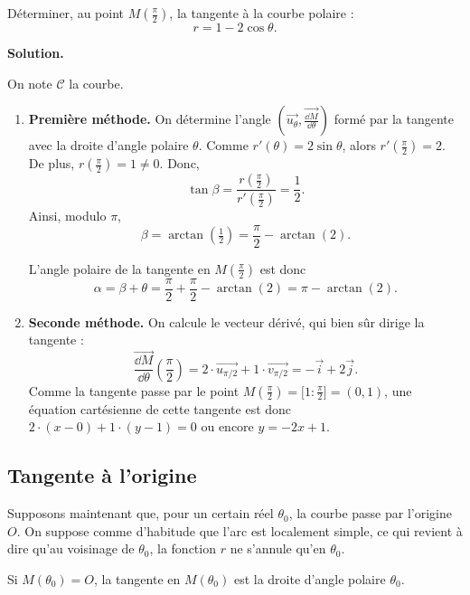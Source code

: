 \documentclass[class=report,crop=false]{standalone}
\begin{document}
\begin{exemple}
Déterminer, au point $M(\frac{\pi}{2})$, la tangente à la courbe polaire :
$$r=1-2\cos\theta.$$

\medskip
\textbf{Solution.}

On note $\mathcal{C}$ la courbe.

\begin{enumerate}
  \item \textbf{Première méthode.}
  On détermine l'angle
  $(\overrightarrow{u_\theta},\overrightarrow{\frac{\dd M}{\dd\theta}})$
  formé par la tangente avec la droite d'angle polaire $\theta$.
  Comme $r'(\theta)=2\sin\theta$, alors $r'(\frac{\pi}{2})=2$.
  De plus, $r(\frac{\pi}{2})=1\neq0$. Donc,
  $$\tan\beta  = \frac{r(\frac{\pi}{2})}{r'(\frac{\pi}{2})} = \frac{1}{2}.$$
  Ainsi, modulo $\pi$,
  $$\beta = \arctan(\tfrac{1}{2})
  = \frac\pi2-\arctan(2).$$

  L'angle polaire de la tangente en $M(\frac{\pi}{2})$ est
donc
$$\alpha=\beta + \theta=\frac\pi2+\frac\pi2-\arctan(2) = \pi-\arctan(2).$$

  \item \textbf{Seconde méthode.}
  On calcule le vecteur dérivé, qui bien sûr dirige la tangente :
  $$\overrightarrow{\frac{\dd M}{\dd\theta}}\left(\frac{\pi}{2}\right)
=2\cdot\overrightarrow{u_{\pi/2}}+1\cdot\overrightarrow{v_{\pi/2}}
=-\overrightarrow{i}+2\overrightarrow{j}.$$
  Comme la tangente passe par le point
  $M(\frac{\pi}{2}) = \big[1:\frac{\pi}{2}\big] = (0,1)$,
une équation cartésienne de cette tangente est donc
$2\cdot(x-0)+1\cdot(y-1)=0$ ou encore $y=-2x+1$.
\end{enumerate}

\end{exemple}



\subsection{Tangente à l'origine}

Supposons maintenant que, pour un certain réel $\theta_0$, la courbe
passe par l'origine $O$. On suppose comme d'habitude que l'arc est
localement simple, ce qui revient à dire qu'au voisinage de $\theta_0$,
la fonction $r$ ne s'annule qu'en $\theta_0$.
\begin{theoreme}
Si $M(\theta_0)=O$, la tangente en $M(\theta_0)$ est la droite
d'angle polaire $\theta_0$.
\end{theoreme}
\end{document}

